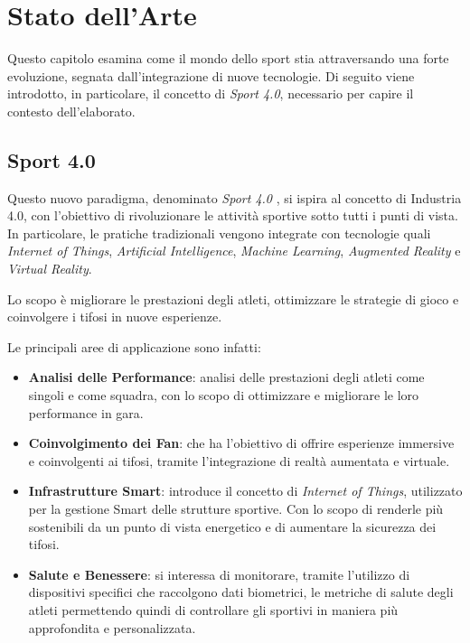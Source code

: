 \chapter{Stato dell'Arte}
\label{chap:Stato dell'Arte}

Questo capitolo esamina come il mondo dello sport stia attraversando una forte evoluzione, segnata dall'integrazione di nuove tecnologie. Di seguito viene introdotto, in particolare, il concetto di \textit{Sport 4.0}, necessario per capire il contesto dell'elaborato.  
\section{Sport 4.0}
\label{sec:sport4.0}

Questo nuovo paradigma, denominato \textit{Sport 4.0} \cite{sport4.0}, si ispira al concetto di Industria 4.0, con l'obiettivo di rivoluzionare le attività sportive sotto tutti i punti di vista. In particolare, le pratiche tradizionali vengono integrate con tecnologie quali \textit{Internet of Things}, \textit{Artificial Intelligence}, \textit{Machine Learning}, \textit{Augmented Reality} e \textit{Virtual Reality}.

\noindent Lo scopo è migliorare le prestazioni degli atleti, ottimizzare le strategie di gioco e coinvolgere i tifosi in nuove esperienze.

\noindent Le principali aree di applicazione sono infatti:
\begin{itemize}
    \item \textbf{Analisi delle Performance}: analisi delle prestazioni degli atleti come singoli e come squadra, con lo scopo di ottimizzare e migliorare le loro performance in gara.
    \item \textbf{Coinvolgimento dei Fan}: che ha l'obiettivo di offrire esperienze immersive e coinvolgenti ai tifosi, tramite l'integrazione di realtà aumentata e virtuale.
    \item \textbf{Infrastrutture Smart}: introduce il concetto di \textit{Internet of Things}, utilizzato per la gestione Smart delle strutture sportive. Con lo scopo di renderle più sostenibili da un punto di vista energetico e di aumentare la sicurezza dei tifosi.
    \item \textbf{Salute e Benessere}: si interessa di monitorare, tramite l'utilizzo di dispositivi specifici che raccolgono dati biometrici, le metriche di salute degli atleti permettendo quindi di controllare gli sportivi in maniera più approfondita e personalizzata.
  \end{itemize}
  

